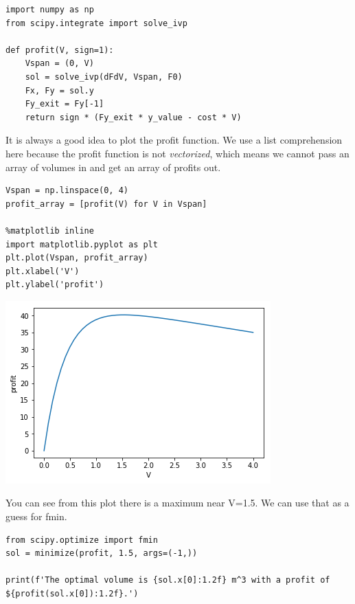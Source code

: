 \documentclass[11pt]{article}
\begin{document}
\begin{verbatim}
import numpy as np
from scipy.integrate import solve_ivp

def profit(V, sign=1):
    Vspan = (0, V)
    sol = solve_ivp(dFdV, Vspan, F0)
    Fx, Fy = sol.y
    Fy_exit = Fy[-1]
    return sign * (Fy_exit * y_value - cost * V)
\end{verbatim}

It is always a good idea to plot the profit function. We use a list comprehension here because the profit function is not \emph{vectorized}, which means we cannot pass an array of volumes in and get an array of profits out.

\begin{verbatim}
Vspan = np.linspace(0, 4)
profit_array = [profit(V) for V in Vspan]

%matplotlib inline
import matplotlib.pyplot as plt
plt.plot(Vspan, profit_array)
plt.xlabel('V')
plt.ylabel('profit')
\end{verbatim}

\begin{center}
\includegraphics[width=.9\linewidth]{obipy-resources/baab0982fed766ced9ac305dd57e067d-90490I6m.png}
\end{center}

You can see from this plot there is a maximum near V=1.5. We can use that as a guess for fmin.

\begin{verbatim}
from scipy.optimize import fmin
sol = minimize(profit, 1.5, args=(-1,))

print(f'The optimal volume is {sol.x[0]:1.2f} m^3 with a profit of ${profit(sol.x[0]):1.2f}.')
\end{verbatim}
\end{document}
